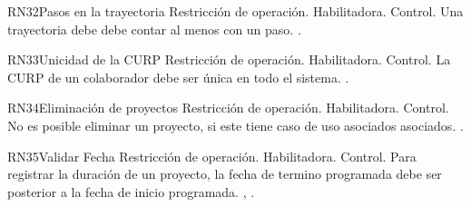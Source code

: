 \begin{BussinesRule}{RN32}{Pasos en la trayectoria} 
	\BRitem[Tipo:] Restricción de operación. 
	\BRitem[Clase:] Habilitadora. 
	\BRitem[Nivel:] Control. %
	\BRitem[Descripción:] Una trayectoria debe debe contar al menos con un paso.
	 \UCref{}{}. 
\end{BussinesRule}

\begin{BussinesRule}{RN33}{Unicidad de la CURP} 
	\BRitem[Tipo:] Restricción de operación. 
	\BRitem[Clase:] Habilitadora. 
	\BRitem[Nivel:] Control. %
	\BRitem[Descripción:] La CURP de un colaborador debe ser única en todo el sistema.
	 . 
\end{BussinesRule}


\begin{BussinesRule}{RN34}{Eliminación de proyectos} 
	\BRitem[Tipo:] Restricción de operación. 
	\BRitem[Clase:] Habilitadora. 
	\BRitem[Nivel:] Control. %
	\BRitem[Descripción:] No es posible eliminar un proyecto, si este tiene caso de uso asociados asociados.
	 . 
\end{BussinesRule}


\begin{BussinesRule}{RN35}{Validar Fecha} 
	\BRitem[Tipo:] Restricción de operación. 
	\BRitem[Clase:] Habilitadora. 
	\BRitem[Nivel:] Control. %
	\BRitem[Descripción:] Para registrar la duración de un proyecto, la fecha de termino programada debe ser posterior a la fecha de inicio programada.
	 , . 
\end{BussinesRule}


